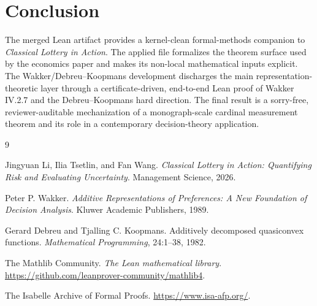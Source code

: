 \documentclass[11pt,english]{article}
\begin{document}
\section{Conclusion}
\label{sec:conclusion}

The merged Lean artifact provides a kernel-clean formal-methods companion to \emph{Classical Lottery in Action}.  The applied file formalizes the theorem surface used by the economics paper and makes its non-local mathematical inputs explicit.  The Wakker/Debreu--Koopmans development discharges the main representation-theoretic layer through a certificate-driven, end-to-end Lean proof of Wakker IV.2.7 and the Debreu--Koopmans hard direction.  The final result is a sorry-free, reviewer-auditable mechanization of a monograph-scale cardinal measurement theorem and its role in a contemporary decision-theory application.

\begin{thebibliography}{9}

Jingyuan Li, Ilia Tsetlin, and Fan Wang.
\newblock \emph{Classical Lottery in Action: Quantifying Risk and Evaluating Uncertainty}.
\newblock Management Science, 2026.

Peter P. Wakker.
\newblock \emph{Additive Representations of Preferences: A New Foundation of Decision Analysis}.
\newblock Kluwer Academic Publishers, 1989.

Gerard Debreu and Tjalling C. Koopmans.
\newblock Additively decomposed quasiconvex functions.
\newblock \emph{Mathematical Programming}, 24:1--38, 1982.

The Mathlib Community.
\newblock \emph{The Lean mathematical library}.
\newblock \url{https://github.com/leanprover-community/mathlib4}.

The Isabelle Archive of Formal Proofs.
\newblock \url{https://www.isa-afp.org/}.

\end{thebibliography}
\end{document}
